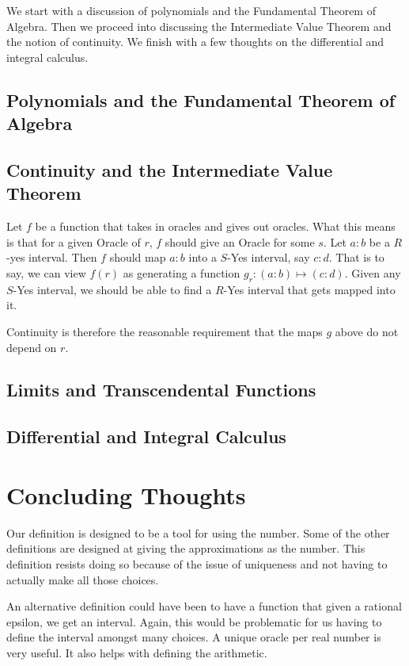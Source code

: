 \documentclass[12pt]{article}
\theoremstyle{remark}
\begin{document}
We start with a discussion of polynomials and the Fundamental Theorem of Algebra. Then we proceed into discussing the Intermediate Value Theorem and the notion of continuity. We finish with a few thoughts on the differential and integral calculus. 

\subsection{Polynomials and the Fundamental Theorem of Algebra}

\subsection{Continuity and the Intermediate Value Theorem}

Let $f$ be a function that takes in oracles and gives out oracles. What this means is that for a given Oracle of $r$, $f$ should give an Oracle for some $s$. Let $a:b$ be a $R$-yes interval. Then $f$ should map $a:b$ into a $S$-Yes interval, say $c:d$. That is to say, we can view $f(r)$ as generating a function $g_r : (a:b) \mapsto (c:d)$. Given any $S$-Yes interval, we should be able to find a $R$-Yes interval that gets mapped into it. 

Continuity is therefore the reasonable requirement that the maps $g$ above do not depend on $r$. 


\subsection{Limits and Transcendental Functions}

\subsection{Differential and Integral Calculus}




\section{Concluding Thoughts}

Our definition is designed to be a tool for using the number. Some of the other definitions are designed at giving the approximations as the number. This definition resists doing so because of the issue of uniqueness and not having to actually make all those choices. 

An alternative definition could have been to have a function that given a rational epsilon, we get an interval. Again, this would be problematic for us having to define the interval amongst many choices. A unique oracle per real number is very useful. It also helps with defining the arithmetic. 
\end{document}
